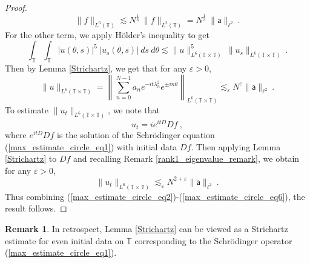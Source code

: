 \documentclass[12pt]{amsart}
\theoremstyle{definition}
\newtheorem{remark}[theorem]{Remark}
\newcommand{\T}{\mathbb T}%
\newcommand{\sa}{\textsf{a}}
\numberwithin{equation}{section}
\begin{document}
\begin{proof}
\begin{equation} \label{max_estimate_circle_eq3}
\|f\|_{L^6(\T )} \lesssim N^{\frac{1}{3}}\:\|f\|_{L^2(\T )}=N^{\frac{1}{3}}\:\|\sa\|_{\ell^2}\:.
\end{equation}
For the other term, we apply H\"older's inequality to get
\begin{equation} \label{max_estimate_circle_eq4}
\int_\T\int_\T |u(\theta,s)|^5\:|u_s(\theta,s)|\:ds\:d\theta \lesssim \|u\|^5_{L^6(\T \times \T)}\:\|u_s\|_{L^6(\T \times \T)}\:.
\end{equation}
Then by Lemma \ref{Strichartz}, we get that for any $\varepsilon>0$,
\begin{equation} \label{max_estimate_circle_eq5}
\|u\|_{L^6(\T \times \T)} = \left\|\sum_{n=0}^{N-1} a_n e^{-it\lambda^2_n}e^{\pm in\theta} \right\|_{L^6(\T \times \T)} \lesssim_\varepsilon N^\varepsilon \|\sa\|_{\ell^2}\:.
\end{equation}
To estimate $\|u_t\|_{L^6(\T \times \T)}$, we note that
\begin{equation*}
u_t= ie^{itD} Df\:,
\end{equation*}
where $e^{itD} Df$ is the solution of the Schr\"odinger equation (\ref{max_estimate_circle_eq1}) with initial data $Df$. Then applying Lemma \ref{Strichartz} to $Df$ and recalling Remark \ref{rank1_eigenvalue_remark}, we obtain for any $\varepsilon>0$,
\begin{equation} \label{max_estimate_circle_eq6}
\|u_t\|_{L^6(\T \times \T)} \lesssim_\varepsilon N^{2+\varepsilon}\|\sa\|_{\ell^2} \:.
\end{equation}
Thus combining (\ref{max_estimate_circle_eq2})-(\ref{max_estimate_circle_eq6}), the result follows.
\end{proof}

\begin{remark} \label{Strichartz_remark}
In retrospect, Lemma \ref{Strichartz} can be viewed as a Strichartz estimate for even initial data on $\T$ corresponding to the Schr\"odinger operator (\ref{max_estimate_circle_eq1}). 
\end{remark}
\end{document}
